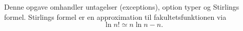 Denne opgave omhandler untagelser (exceptions), option typer og Stirlings formel. Stirlings formel er en approximation til fakultetsfunktionen via $$\ln n! \simeq n \ln n - n.$$